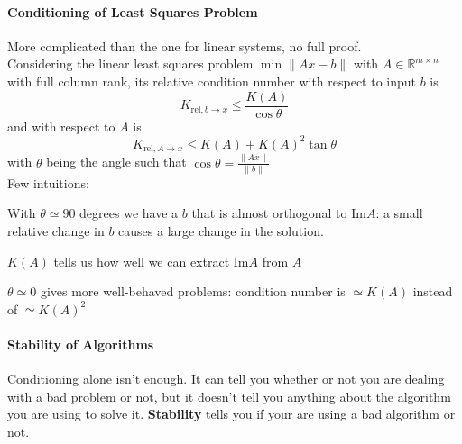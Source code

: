 \documentclass[10pt]{report}
\begin{document}
\paragraph{Conditioning of Least Squares Problem} More complicated than the one for linear systems, no full proof.\\
Considering the linear least squares problem $\min\|Ax-b\|$ with $A\in\mathbb{R}^{m\times n}$ with full column rank, its relative condition number with respect to input $b$ is $$K_{\text{rel}, b\to x}\leq\frac{K(A)}{\cos\theta}$$ and with respect to $A$ is $$K_{\text{rel}, A\to x}\leq K(A)+K(A)^2\tan\theta$$ with $\theta$ being the angle such that $\cos\theta=\frac{\|Ax\|}{\|b\|}$\\
Few intuitions:\begin{list}{}{}
	\item With $\theta\simeq 90$ degrees we have a $b$ that is almost orthogonal to $\text{Im}A$: a small relative change in $b$ causes a large change in the solution.
	\item $K(A)$ tells us how well we can extract $\text{Im}A$ from $A$
	\item $\theta\simeq 0$ gives more well-behaved problems: condition number is $\simeq K(A)$ instead of $\simeq K(A)^2$
\end{list}
\paragraph{Stability of Algorithms} Conditioning alone isn't enough. It can tell you whether or not you are dealing with a bad problem or not, but it doesn't tell you anything about the algorithm you are using to solve it. \textbf{Stability} tells you if your are using a bad algorithm or not.
\end{document}
